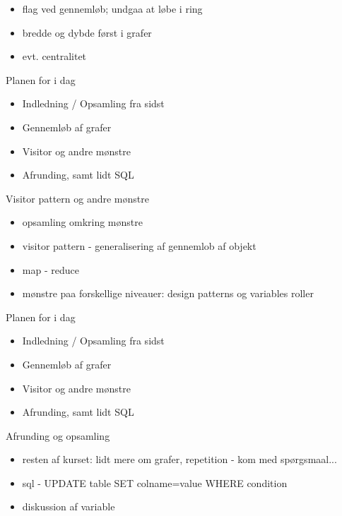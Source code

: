\documentclass[a4paper,landscape]{slides}
\begin{document}
\begin{slide}
\begin{itemize}
       \item  flag ved gennemløb; undgaa at løbe i ring
       \item  bredde og dybde først i grafer
       \item  evt. centralitet
\end{itemize} \end{slide} \begin{slide} \begin{center} {\large 
Planen for i dag
} \end{center} \begin{itemize} \addtolength{\itemsep}{-\baselineskip}
   \item Indledning / Opsamling fra sidst
   \item Gennemløb af grafer
   \item Visitor og andre mønstre
   \item Afrunding, samt lidt SQL
\end{itemize} \end{slide} \begin{slide} \begin{center} {\large 
        Visitor pattern og andre mønstre
} \end{center} \begin{itemize} \addtolength{\itemsep}{-\baselineskip}
       \item  opsamling omkring mønstre
       \item  visitor pattern - generalisering af gennemlob af objekt
       \item  map - reduce
       \item  mønstre paa forskellige niveauer: design patterns og variables roller
\end{itemize} \end{slide} \begin{slide} \begin{center} {\large 
Planen for i dag
} \end{center} \begin{itemize} \addtolength{\itemsep}{-\baselineskip}
   \item Indledning / Opsamling fra sidst
   \item Gennemløb af grafer
   \item Visitor og andre mønstre
   \item Afrunding, samt lidt SQL
\end{itemize} \end{slide} \begin{slide} \begin{center} {\large 
        Afrunding og opsamling
} \end{center} \begin{itemize} \addtolength{\itemsep}{-\baselineskip}
       \item  resten af kurset: lidt mere om grafer, repetition - kom med spørgsmaal...
       \item  sql - UPDATE table SET colname=value WHERE condition
       \item  diskussion af variable
\end{itemize} \end{slide}


\begin{comment}
torsdag:
        centralitet
        netværk, shortest path,
        repetition - webapplikationer, sql
\end{comment}
\end{document}

